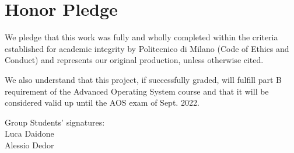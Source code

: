 \documentclass[10pt,a4]{article}
\begin{document}
\section{Honor Pledge}

We pledge that this work was fully and wholly completed within the criteria
established for academic integrity by Politecnico di Milano (Code of Ethics and
Conduct) and represents our original production, unless otherwise cited.

We also understand that this project, if successfully graded,  will fulfill part B requirement of the
Advanced Operating System course and that it will be considered valid up until
the AOS exam of Sept. 2022. 

\begin{flushright}
Group Students' signatures:\\
Luca Daidone\\
Alessio Dedor
\end{flushright}
\end{document}
